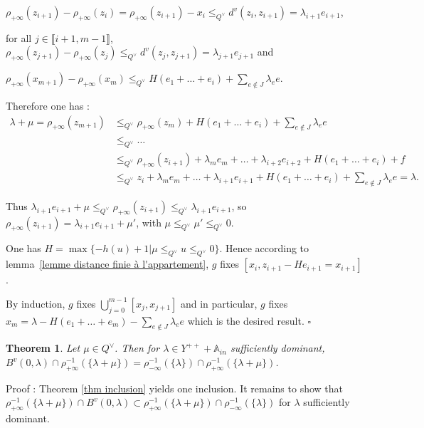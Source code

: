 \documentclass[12pt]{article}
\theoremstyle{plain}
\newtheorem{thm}{Theorem}[section] %
\theoremstyle{definition}
\newcommand{\A}{\mathbb{A}}
\begin{document}
$\rho_{+\infty}(z_{i+1})-\rho_{+\infty}(z_i)=\rho_{+\infty}(z_{i+1})-x_i\leq_{Q^\vee}d^v(z_i,z_{i+1})=\lambda_{i+1}e_{i+1}$, 
 
for all $j\in \llbracket i+1, m-1\rrbracket$, $\rho_{+\infty}(z_{j+1})-\rho_{+\infty}(z_j)\leq_{Q^\vee} d^v(z_j,z_{j+1})= \lambda_{j+1}e_{j+1}$ and
 
$\rho_{+\infty}(x_{m+1})-\rho_{+\infty}(x_m)\leq_{Q^\vee} H(e_1+\ldots + e_i)+\sum_{e\notin J}\lambda_e e$.


Therefore one has :   \[\begin{aligned} \lambda+\mu =\rho_{+\infty}(z_{m+1})& \leq_{Q^\vee}\rho_{+\infty}(z_m)+H(e_1+\ldots+ e_i)+\sum_{e\notin J}\lambda_e e\\&\leq_{Q^\vee} \ldots \\ &\leq_{Q^\vee} \rho_{+\infty}(z_{i+1})+\lambda_m e_m+\ldots+\lambda_{i+2}e_{i+2}+H(e_1+\ldots+e_{i})+f\\ &\leq_{Q^\vee}z_i+\lambda_m e_m+\ldots+\lambda_{i+1}e_{i+1}+H(e_1+\ldots+e_i)+\sum_{e\notin J}\lambda_e e=\lambda.\end{aligned}\]

Thus $\lambda_{i+1}e_{i+1}+\mu\leq_{Q^\vee}\rho_{+\infty}(z_{i+1})\leq_{Q^\vee}\lambda_{i+1}e_{i+1}$, so $\rho_{+\infty}(z_{i+1})=\lambda_{i+1}e_{i+1}+\mu'$, with $\mu\leq_{Q^\vee} \mu'\leq_{Q^\vee} 0$.


One has $H=\max\{-h(u)+1|\mu\leq_{Q^\vee}u\leq_{Q^\vee}0\}$. Hence according to lemma~\ref{lemme distance finie à l'appartement}, $g$ fixes $[x_i,z_{i+1}-He_{i+1}=x_{i+1}]$. 
 
By induction, $g$ fixes $\bigcup_{j=0}^{m-1}[x_j,x_{j+1}]$ and in particular, $g$ fixes $x_m=\lambda-H(e_1+\ldots+e_m)-\sum_{e\notin J}\lambda_e e$ which is the desired result. $\square$
 


    
 \begin{thm}\label{thm égalité des ensembles bis}
 Let $\mu\in Q^\vee$. Then for $\lambda\in Y^{++}+\A_{in}$ sufficiently dominant, $B^v(0,\lambda)\cap \rho_{+\infty}^{-1}(\{\lambda+\mu\})=\rho_{-\infty}^{-1}(\{\lambda\})\cap\rho_{+\infty}^{-1}(\{\lambda+\mu\})$.
 \end{thm}
 
 
Proof : Theorem \ref{thm inclusion} yields one inclusion. It remains to show that $\rho_{+\infty}^{-1}(\{\lambda+\mu\})\cap B^v(0,\lambda)\subset\rho_{+\infty}^{-1}(\{\lambda+\mu\})\cap \rho_{-\infty}^{-1}(\{\lambda\})$ 
for $\lambda$ sufficiently dominant.
\end{document}
